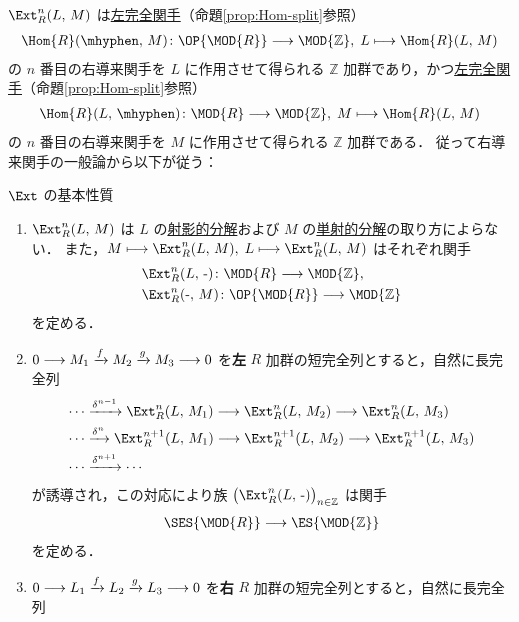 \documentclass[algtopo_main]{subfiles}
\begin{document}
$\Ext_R^n(L,\, M)$ は\hyperref[def:Ab-func]{左完全関手}（命題\ref{prop:Hom-split}参照）
\begin{align}
    \Hom{R} (\mhyphen,\, M) \colon \OP{\MOD{R}} \lto \MOD{\mathbb{Z}},\; L \lmto \Hom{R}(L,\, M)
\end{align}
の $n$ 番目の右導来関手を $L$ に作用させて得られる $\mathbb{Z}$ 加群であり，かつ\hyperref[def:Ab-func]{左完全関手}（命題\ref{prop:Hom-split}参照）
\begin{align}
    \Hom{R} (L,\, \mhyphen) \colon \MOD{R} \lto \MOD{\mathbb{Z}},\; M \lmto \Hom{R}(L,\, M)
\end{align}
の $n$ 番目の右導来関手を $M$ に作用させて得られる $\mathbb{Z}$ 加群である．
従って右導来関手の一般論から以下が従う：

\begin{myprop}[label=prop:Ext-basic, breakable]{$\Ext$ の基本性質}
    \begin{enumerate}
        \item $\Ext_R^n(L,\, M)$ は $L$ の\hyperref[def:injective-resolution]{射影的分解}および $M$ の\hyperref[def:injective-resolution]{単射的分解}の取り方によらない．
        また，$M \lmto \Ext^n_R(L,\, M),\; L \lmto \Ext^n_R(L,\, M)$ はそれぞれ関手
        \begin{align}
            &\Ext^n_R(L,\, \text{-}) \colon \MOD{R} \lto \MOD{\mathbb{Z}}, \\
            &\Ext^n_R(\text{-},\, M) \colon \OP{\MOD{R}} \lto \MOD{\mathbb{Z}}
        \end{align}
        を定める．
        \item $0 \longrightarrow M_1 \xrightarrow{f} M_2 \xrightarrow{g} M_3 \longrightarrow 0$ を\textbf{左} $R$ 加群の短完全列とすると，自然に長完全列
        \begin{align}
            \cdots &\xrightarrow{\delta^{n-1}} \Ext^n_R(L,\, M_1) \lto \Ext^n_R(L,\, M_2) \lto \Ext^n_R(L,\, M_3) \\
            \cdots &\xrightarrow{\delta^{n}} \Ext^{n+1}_R(L,\, M_1) \lto \Ext^{n+1}_R(L,\, M_2) \lto \Ext^{n+1}_R(L,\, M_3) \\
            \cdots &\xrightarrow{\delta^{n+1}} \cdots
        \end{align}
        が誘導され，この対応により族 $\bigl( \Ext^n_R(L,\, \text{-}) \bigr)_{n \in \mathbb{Z}}$ は関手
        \begin{align}
            \SES{\MOD{R}} \lto \ES{\MOD{\mathbb{Z}}}
        \end{align}
        を定める．
        \item $0 \longrightarrow L_1 \xrightarrow{f} L_2 \xrightarrow{g} L_3 \longrightarrow 0$ を\textbf{右} $R$ 加群の短完全列とすると，自然に長完全列

\end{enumerate}
\end{myprop}
\end{document}

